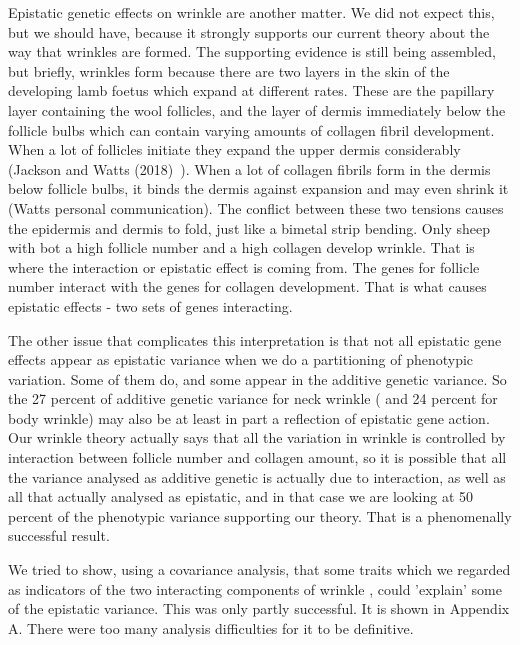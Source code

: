 \documentclass[titlepage]{article}  %
\begin{document}
Epistatic genetic effects on wrinkle are another matter. We did not expect this, but we should have, because it strongly supports our current theory about the way that wrinkles are formed.  The supporting evidence is still being assembled, but briefly, wrinkles form because there are two layers in the skin of the developing lamb foetus which expand at different rates. These are the papillary layer containing the wool follicles, and the layer of dermis immediately below the follicle bulbs which can contain varying amounts of collagen fibril development. When a lot of follicles initiate they expand the upper dermis considerably (Jackson and Watts (2018)~\cite{jack:18}). When a lot of collagen fibrils form in the dermis below follicle bulbs, it binds the dermis against expansion and may even shrink it (Watts personal communication). The conflict between these two tensions causes the epidermis and dermis to fold, just like a bimetal strip bending. Only sheep with bot a high follicle number and a high collagen develop wrinkle. That is where the interaction or epistatic effect is coming from. The genes for follicle number interact with the genes for collagen development.  That is what causes epistatic effects - two sets of genes interacting.

The other issue that complicates this interpretation is that not all epistatic gene effects appear as epistatic variance when we do a partitioning of phenotypic variation. Some of them do, and some appear in the additive genetic variance. So the 27 percent of additive genetic variance for neck wrinkle ( and 24 percent for body wrinkle) may also be  at least in part a reflection of epistatic gene action. Our wrinkle theory actually says that all the variation in wrinkle is controlled by interaction between follicle number and collagen amount, so it is possible that all the variance analysed as additive genetic is actually due to interaction, as well as all that actually analysed as epistatic, and in that case we are looking at 50 percent of the phenotypic variance supporting our theory. That is a phenomenally successful result. 

We tried to show, using a covariance analysis, that some traits which we regarded as indicators of the two interacting components of wrinkle , could 'explain' some of the epistatic variance. This was only partly successful. It is shown in Appendix A. There were too many analysis difficulties for it to be definitive.

\appendix
\end{document}
